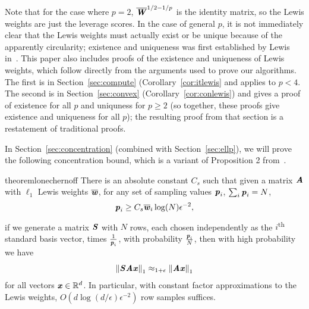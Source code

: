 Note that for the case where $p = 2$, $\WWbar^{1/2 - 1/p}$ is the identity matrix,
so the Lewis weights are just the leverage scores.  In the case of general $p$,
it is not immediately clear that the Lewis weights must actually exist or be unique
because of the apparently circularity; existence and uniqueness was first established
by Lewis in~\cite{lewis}.  This paper also includes proofs of the existence and
uniqueness of Lewis weights, which follow directly from the arguments used to
prove our algorithms.  The first is in Section~\ref{sec:compute} (Corollary~\ref{cor:itlewis}
and applies to $p < 4$.  The second is in Section~\ref{sec:convex} (Corollary~\ref{cor:conlewis})
and gives a proof of existence for all $p$ and uniquness for $p \geq 2$ (so together, these
proofs give existence and uniqueness for all $p$); the resulting proof from that section
is a restatement of traditional proofs.

In Section~\ref{sec:concentration} (combined with Section~\ref{sec:ellp}),
we will prove the following concentration bound,
which is a variant of Proposition 2 from~\cite{Talagrand90}.
\begin{restatable}{theorem}{lonechernoff}
\label{thm:l1chernoff}
There is an absolute constant $C_s$ such that given a matrix $\AA$
with $\ell_1$ Lewis weights $\wwbar$, for any set of sampling values $\pp_i$,
$\sum_i \pp_i = N$,
\begin{equation*}
\pp_i \geq C_s \wwbar_i \log(N) \epsilon^{-2},
\end{equation*}
if we generate a matrix $\SS$ with $N$ rows, each chosen
independently as the $i$\textsuperscript{th} standard basis vector,
times $\frac{1}{\pp_i}$, with probability $\frac{\pp_i}{N}$,
then with high probability we have
\begin{equation*}
\norm{\SS \AA \xx}_1
\approx_{1 + \epsilon} \norm{\AA \xx}_1
\end{equation*}
for all vectors $\xx \in \Re^{d}$.  In particular, with constant factor
approximations to the Lewis weights, $O(d \log(d/\epsilon) \epsilon^{-2})$
row samples suffices.
\end{restatable}

